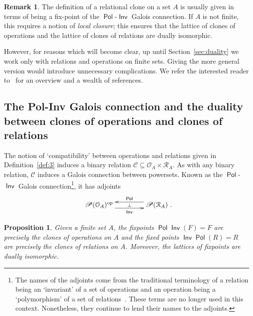 \documentclass[11pt, a4paper, twoside,leqno]{amsart}
\newcommand{\cd}[2][]{\vcenter{\hbox{\xymatrix#1{#2}}}}
\newcommand{\C}{{\mathcal C}}
\renewcommand{\O}{{\mathcal O}}
\newcommand{\R}{{\mathcal R}}
\numberwithin{equation}{section}
\theoremstyle{plain}
\newtheorem{Prop}[Thm]{Proposition}
\theoremstyle{definition}
\newtheorem{Rk}[Thm]{Remark}
\DeclareMathOperator{\Pol}{\mathsf{Pol}}
\DeclareMathOperator{\Inv}{\mathsf{Inv}}
\begin{document}
\begin{Rk}
  \label{rk:finite-vs-non}
  The definition of a relational clone on a set \(A\) is usually given
  in terms of
  being a fix-point of the \(\Pol\)-\(\Inv\) Galois connection. If \(A\) is not finite, this requires a notion of
  \emph{local closure}; this ensures that the lattice of clones of
  operations and the lattice of clones of relations are dually isomorphic. 

  However, for reasons which will become clear, up until
  Section~\ref{sec:duality} we work only with relations and operations on
  finite sets. Giving the more general version would introduce
  unnecessary complications. We refer the interested reader
  to~\cite{Kerkhoff:2014aa} for an overview and a wealth of references.
\end{Rk}



\subsection{The Pol-Inv Galois connection and the duality between
  clones of operations and clones of relations}
\label{sec:pol-inv-galois}

The notion of `compatibility' between operations and relations given
in Definition~\ref{def:3} induces a binary relation
\(\C \subseteq \O_{A} \times \R_{A}
\).
As with any binary relation, \(\C\) induces a Galois connection
between powersets. Known as
the \(\Pol\)-\(\Inv\) Galois connection\footnote{The names of the adjoints come from the traditional terminology of a
  relation being an `invariant' of a set of operations and an
  operation being a `polymorphism' of a set of relations~\cite{Kerkhoff:2014aa}. These terms
  are no longer used in this context. Nonetheless, they continue to lend their names to the adjoints. 
}, it has adjoints
\begin{equation*}
  \xymatrixcolsep{3.5pc}
  \xymatrixrowsep{2.5pc}
  \cd{
    {\mathscr{P} (\O_{A})^\mathrm{op}} \ar@<-4.5pt>[r]_-{\Inv} \ar@{<-}@<4.5pt>[r]^-{\Pol} \ar@{}[r]|-{\bot} &
    {\mathscr{P} (\R_{A})
      \rlap{ .}} 
  }
\end{equation*}

\begin{Prop}
  \label{prop:3}
  Given a finite
  set
  \(A\), the fixpoints \(\Pol\Inv(F)=F\) are precisely the clones of
  operations on \(A\) and the fixed points \(\Inv\Pol(R)=R\) are
  precisely the clones of relations on \(A\). Moreover, the lattices
  of fixpoints are dually isomorphic.  
\end{Prop}
\end{document}
